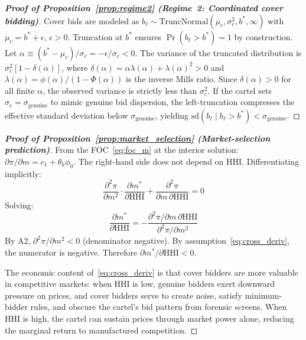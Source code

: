 \begin{proof}[\textbf{Proof of Proposition~\ref{prop:regime2} (Regime~2: Coordinated cover bidding)}]
Cover bids are modeled as $b_\ell \sim
\text{TruncNormal}(\mu_c, \sigma_c^2, b^*, \infty)$ with
$\mu_c = b^* + \epsilon$, $\epsilon > 0$. Truncation at $b^*$
ensures $\Pr(b_\ell > b^*) = 1$ by construction. Let
$\alpha \equiv (b^* - \mu_c)/\sigma_c = -\epsilon/\sigma_c < 0$.
The variance of the truncated distribution is
$\sigma_c^2[1 - \delta(\alpha)]$, where
$\delta(\alpha) = \alpha\lambda(\alpha) + \lambda(\alpha)^2 > 0$
and $\lambda(\alpha) = \phi(\alpha)/(1 - \Phi(\alpha))$ is the
inverse Mills ratio. Since $\delta(\alpha) > 0$ for all finite
$\alpha$, the observed variance is strictly less than $\sigma_c^2$.
If the cartel sets $\sigma_c = \sigma_{\text{genuine}}$ to mimic
genuine bid dispersion, the left-truncation compresses the effective
standard deviation below $\sigma_{\text{genuine}}$, yielding
$\text{sd}(b_\ell \mid b_\ell > b^*) < \sigma_{\text{genuine}}$.
\end{proof}

\begin{proof}[\textbf{Proof of Proposition~\ref{prop:market_selection} (Market-selection prediction)}]
From the FOC~\eqref{eq:foc_m} at the interior solution:
$\partial \pi / \partial m = c_1 + \theta_k \phi_0$. The right-hand
side does not depend on HHI. Differentiating implicitly:
\[
  \frac{\partial^2 \pi}{\partial m^2} \cdot
  \frac{\partial m^*}{\partial \text{HHI}}
  + \frac{\partial^2 \pi}{\partial m \, \partial \text{HHI}} = 0
\]
Solving:
\[
  \frac{\partial m^*}{\partial \text{HHI}} =
  -\frac{\partial^2 \pi / \partial m \, \partial \text{HHI}}
  {\partial^2 \pi / \partial m^2}
\]
By A2, $\partial^2 \pi / \partial m^2 < 0$ (denominator negative).
By assumption~\eqref{eq:cross_deriv}, the numerator is negative.
Therefore $\partial m^* / \partial \text{HHI} < 0$.

The economic content of~\eqref{eq:cross_deriv} is that cover bidders
are more valuable in competitive markets: when HHI is low, genuine
bidders exert downward pressure on prices, and cover bidders serve to
create noise, satisfy minimum-bidder rules, and obscure the cartel's
bid pattern from forensic screens. When HHI is high, the cartel can
sustain prices through market power alone, reducing the marginal return
to manufactured competition.
\end{proof}


